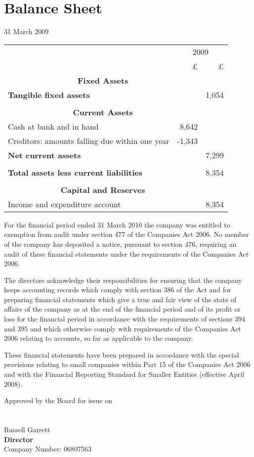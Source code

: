 \section{Balance Sheet}
31 March 2009

\begin{center}
\begin{tabular}{  l  r  r }
\toprule
                            & \multicolumn{2}{c}{2009} \\
\cmidrule(r){2-3}
                            & £     & £ \\
    \multicolumn{2}{c}{{\bf Fixed Assets}} &\\
    {\bf Tangible fixed assets}   &       & 1,054 \\ \cmidrule{2-3} \\
    \multicolumn{2}{c}{{\bf Current Assets}}&\\
    Cash at bank and in hand & 8,642 & \\
    Creditors: amounts falling due within one year & -1,343 & \\
    {\bf Net current assets}    &   & 7,299 \\ \cmidrule{2-3} \\
    {\bf Total assets less current liabilities} & & 8,354 \\ \cmidrule{2-3} \\
    \multicolumn{2}{c}{{\bf Capital and Reserves}}&\\
    Income and expenditure account     &   &   8,354 \\
\bottomrule
\end{tabular}

\end{center}

{\footnotesize For the financial period ended 31 March 2010 the
company was entitled to exemption from audit under section 477 of the
Companies Act 2006. No member of the company has deposited a
notice, pursuant to section 476, requiring an audit of these
financial statements under the requirements of the Companies Act
2006.

The directors acknowledge their responsibilities for ensuring that
the company keeps accounting records which comply with section 386
of the Act and for preparing financial statements which give a true
and fair view of the state of affairs of the company as at the end
of the financial period and of its profit or loss for the financial
period in accordance with the requirements of sections 394 and 395
and which otherwise comply with requirements of the Companies Act
2006 relating to accounts, so far as applicable to the company.

These financial statements have been prepared in accordance with
the special provisions relating to small companies within Part 15
of the Companies Act 2006 and with the Financial Reporting Standard
for Smaller Entities (effective April 2008).}

\vfill

Approved by the Board for issue on \\\\\\

Russell Garrett \\
{\bf Director} \\
Company Number: 06807563

\pagebreak
